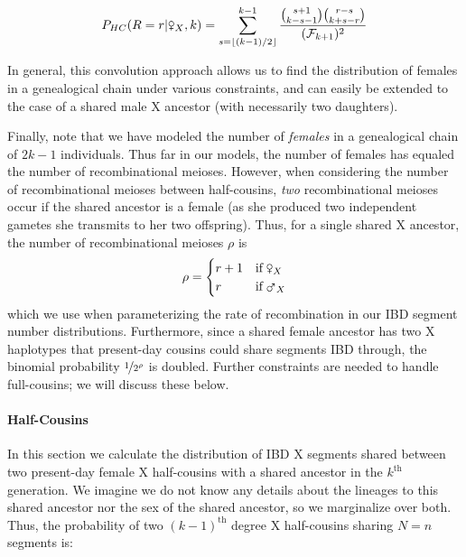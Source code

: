 \documentclass[9pt,twocolumn,twoside]{gsajnl}
\newcommand{\msxa}{\mars_X}
\newcommand{\fsxa}{\venus_X}
\begin{document}
\begin{equation}
  \label{eq:prob-r-given-female}
  P_{HC}(R=r | \fsxa, k) = \sum_{s=\lfloor (k-1)/2 \rfloor}^{k-1} \frac{ {s + 1 \choose k - s - 1 } { r - s \choose k + s - r } }{(\mathcal{F}_{k+1})^2}
\end{equation}

In general, this convolution approach allows us to find the distribution of
females in a genealogical chain under various constraints, and can easily be
extended to the case of a shared male X ancestor (with necessarily two
daughters).
 
Finally, note that we have modeled the number of \emph{females} in a
genealogical chain of $2k-1$ individuals. Thus far in our models, the number of
females has equaled the number of recombinational meioses. However, when
considering the number of recombinational meioses between half-cousins,
\emph{two} recombinational meioses occur if the shared ancestor is a female (as
she produced two independent gametes she transmits to her two offspring). Thus,
for a single shared X ancestor, the number of recombinational meioses $\rho$ is
%
\begin{equation}
  \rho = \begin{cases}
        r + 1 & \text{if} \; \fsxa\\
        r & \text{if} \; \msxa\\
      \end{cases}
\label{eq:recomb-total}
\end{equation}
%
which we use when parameterizing the rate of recombination in our IBD segment
number distributions. Furthermore, since a shared female ancestor has two X
haplotypes that present-day cousins could share segments IBD through, the
binomial probability $\nicefrac{1}{2^\rho}$ is doubled. Further constraints are
needed to handle full-cousins; we will discuss these below.

\paragraph{Half-Cousins}
\label{p:ibd-seg-num-x}

In this section we calculate the distribution of IBD X segments shared between
two present-day female X half-cousins with a shared ancestor in the $k^\text{th}$
generation. We imagine we do not know any details about the lineages to this
shared ancestor nor the sex of the shared ancestor, so we marginalize over
both. Thus, the probability of two $(k-1)^\text{th}$ degree X half-cousins
sharing $N=n$ segments is:
\end{document}
